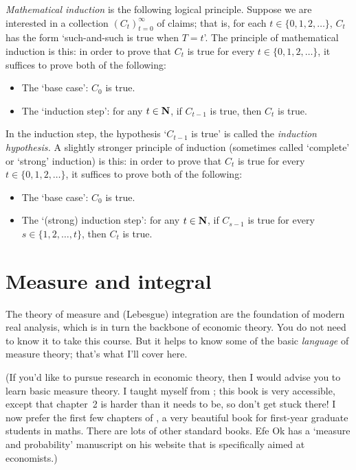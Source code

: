\documentclass[11pt,letterpaper,reqno,oneside]{book}
\begin{document}
\begin{appendices}
\emph{Mathematical induction} is the following logical principle. Suppose we are interested in a collection $(C_t)_{t=0}^\infty$ of claims; that is, for each $t \in \{0,1,2,\dots\}$, $C_t$ has the form `such-and-such is true when $T=t$'. The principle of mathematical induction is this: in order to prove that $C_t$ is true for every $t \in \{0,1,2,\dots\}$, it suffices to prove both of the following:

\begin{itemize}

	\item The `base case': $C_0$ is true.

	\item The `induction step': for any $t \in \mathbf{N}$, if $C_{t-1}$ is true, then $C_t$ is true.

\end{itemize}
%
In the induction step, the hypothesis `$C_{t-1}$ is true' is called the \emph{induction hypothesis.}
A slightly stronger principle of induction (sometimes called `complete' or `strong' induction) is this: in order to prove that $C_t$ is true for every $t \in \{0,1,2,\dots\}$, it suffices to prove both of the following:

\begin{itemize}

	\item The `base case': $C_0$ is true.

	\item The `(strong) induction step': for any $t \in \mathbf{N}$, if $C_{s-1}$ is true for every $s \in \{1,2,\dots,t\}$, then $C_t$ is true.

\end{itemize}



\section{Measure and integral}
\label{math:meas}

The theory of measure and (Lebesgue) integration are the foundation of modern real analysis, which is in turn the backbone of economic theory.
You do not need to know it to take this course.
But it helps to know some of the basic \emph{language} of measure theory; that's what I'll cover here.

(If you'd like to pursue research in economic theory, then I would advise you to learn basic measure theory.
I taught myself from \textcite{Rosenthal2006}; this book is very accessible, except that chapter~2 is harder than it needs to be, so don't get stuck there! I now prefer the first few chapters of \textcite{Folland1999}, a very beautiful book for first-year graduate students in maths. There are lots of other standard books. Efe Ok has a `measure and probability' manuscript on his website that is specifically aimed at economists.)



\end{appendices}
\end{document}
